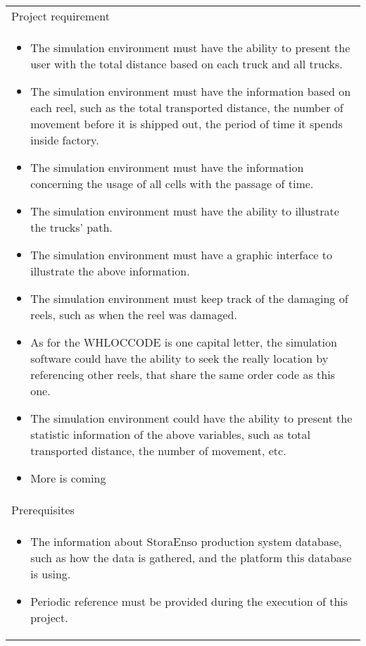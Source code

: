 \documentclass{report}
\begin{document}
\begin{table}[h]
\begin{tabular}{| p{12cm} |}
	\hline
	Project requirement \\
	\begin{itemize}
	\item
	The simulation environment must have the ability to present the user with the total distance based on each truck and all trucks.
	\item
	The simulation environment must have the information based on each reel, such as the total transported distance, the number of movement before it 
	is shipped out, the period of time it spends inside factory.
	\item
	The simulation environment must have the information concerning the usage of all cells with the passage of time.
	\item
	The simulation environment must have the ability to illustrate the trucks' path.
	\item
	The simulation environment must have a graphic interface to illustrate the above information.
	\item
	The simulation environment must keep track of the damaging of reels, such as when the reel was damaged.
	\item
	As for the WHLOCCODE is one capital letter, the simulation software could have the ability to seek the really location by referencing other reels, 
	that share the same order code as this one.
	\item
	The simulation environment could have the ability to present the statistic information of the above variables, such as  total transported 
	distance, the number of movement, etc.
	\item
	More is coming
	\end{itemize}
	\\
	\hline
	Prerequisites \\
	\begin{itemize}
	\item
	The information about StoraEnso production system database, such as how the data is gathered, and the platform this database is using.
	\item
	Periodic reference must be provided during the execution of this project.
	\end{itemize}
	\\
	\hline
\end{tabular}
\end{table}
\end{document}
